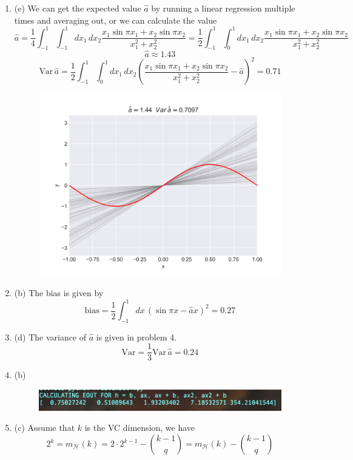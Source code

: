 \documentclass[12pt]{article}
\begin{document}
\begin{enumerate}[leftmargin=*]
\begin{figure}[h!]
\end{figure}
\item (e) We can get the expected value $\hat a$ by running a linear regression multiple times and averaging out, or we can calculate the value
\[ \hat a = \frac{1}{4}\int_{-1}^1 \int_{-1}^1 dx_1 \, dx_2 \frac{x_1 \sin \pi x_1 + x_2 \sin \pi x_2}{x_1^2 + x_2^2} = \frac{1}{2} \int_{-1}^1 \int_0^1 dx_1 \, dx_2 \frac{x_1 \sin \pi x_1 + x_2 \sin \pi x_2}{x_1^2 + x_2^2} \]
\[ \hat a \approx 1.43 \]
\[ \text{Var} \, \hat a = \frac{1}{2} \int_{-1}^1 \int_{0}^1 d x_1 \, dx_2 \left( \frac{x_1 \sin \pi x_1 + x_2 \sin \pi x_2}{x_1^2 + x_2^2} - \hat a \right)^2 = 0.71 \]
\begin{figure}[h!]
\centering
\includegraphics[scale=0.55]{SinLinReg.png}
\end{figure}
\item (b) The bias is given by
\[ \text{bias} = \frac{1}{2} \int_{-1}^1 dx \, \left( \sin \pi x - \hat a x \right)^2 = 0.27 \]
\item (d) The variance of $\hat a$ is given in problem 4.
\[ \text{Var} = \frac{1}{3} \text{Var} \, \hat a = 0.24 \]
\item (b)
\begin{figure}[h!]
\centering
\includegraphics[scale=0.8]{eoutfig.png}
\end{figure}
\item (c) Assume that $k$ is the VC dimension, we have
\[ 2^k = m_{\mathcal H} (k) = 2 \cdot 2^{k-1} - \binom{k-1}{q} = m_{\mathcal H}(k)- \binom{k-1}{q} \]

\end{enumerate}
\end{document}
